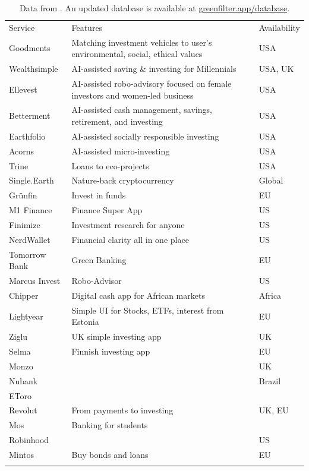\documentclass[
  letterpaper,
  DIV=11,
  numbers=noendperiod]{scrartcl}
\begin{document}
\begin{longtable}[]{@{}
  >{\raggedright\arraybackslash}p{}
  >{\raggedright\arraybackslash}p{}
  >{\raggedright\arraybackslash}p{}@{}}
\caption{Data from
\citep{ZigluFastSimple, lightyearLightyearInvestingOwn, SelmaYourFinances, MosMoneyApp, monzoOnlineBankingMade2023, NubankFinalmenteVoce}.
An updated database is available at
\href{https://www.greenfilter.app/database}{greenfilter.app/database}.}\tabularnewline
\toprule\noalign{}
\endfirsthead
\endhead
\bottomrule\noalign{}
\endlastfoot
Service & Features & Availability \\
Goodments & Matching investment vehicles to user's environmental,
social, ethical values & USA \\
Wealthsimple & AI-assisted saving \& investing for Millennials & USA,
UK \\
Ellevest & AI-assisted robo-advisory focused on female investors and
women-led business & USA \\
Betterment & AI-assisted cash management, savings, retirement, and
investing & USA \\
Earthfolio & AI-assisted socially responsible investing & USA \\
Acorns & AI-assisted micro-investing & USA \\
Trine & Loans to eco-projects & USA \\
Single.Earth & Nature-back cryptocurrency & Global \\
Grünfin & Invest in funds & EU \\
M1 Finance & Finance Super App & US \\
Finimize & Investment research for anyone & US \\
NerdWallet & Financial clarity all in one place & US \\
Tomorrow Bank & Green Banking & EU \\
Marcus Invest & Robo-Advisor & US \\
Chipper & Digital cash app for African markets & Africa \\
Lightyear & Simple UI for Stocks, ETFs, interest from Estonia & EU \\
Ziglu & UK simple investing app & UK \\
Selma & Finnish investing app & EU \\
Monzo & & UK \\
Nubank & & Brazil \\
EToro & & \\
Revolut & From payments to investing & UK, EU \\
Mos & Banking for students & \\
Robinhood & & US \\
Mintos & Buy bonds and loans & EU \\
& & \\
\end{longtable}
\end{document}
